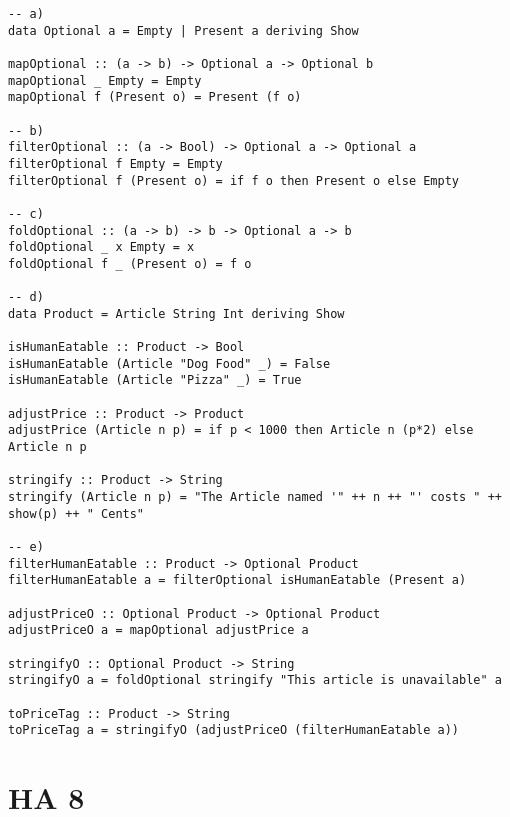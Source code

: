 \documentclass[a4paper]{article}
\begin{document}
\begin{lstlisting}
-- a)
data Optional a = Empty | Present a deriving Show

mapOptional :: (a -> b) -> Optional a -> Optional b
mapOptional _ Empty = Empty
mapOptional f (Present o) = Present (f o)

-- b)
filterOptional :: (a -> Bool) -> Optional a -> Optional a
filterOptional f Empty = Empty
filterOptional f (Present o) = if f o then Present o else Empty 

-- c)
foldOptional :: (a -> b) -> b -> Optional a -> b
foldOptional _ x Empty = x
foldOptional f _ (Present o) = f o

-- d)
data Product = Article String Int deriving Show

isHumanEatable :: Product -> Bool
isHumanEatable (Article "Dog Food" _) = False
isHumanEatable (Article "Pizza" _) = True 

adjustPrice :: Product -> Product
adjustPrice (Article n p) = if p < 1000 then Article n (p*2) else Article n p

stringify :: Product -> String
stringify (Article n p) = "The Article named '" ++ n ++ "' costs " ++ show(p) ++ " Cents"

-- e)
filterHumanEatable :: Product -> Optional Product
filterHumanEatable a = filterOptional isHumanEatable (Present a)

adjustPriceO :: Optional Product -> Optional Product
adjustPriceO a = mapOptional adjustPrice a

stringifyO :: Optional Product -> String
stringifyO a = foldOptional stringify "This article is unavailable" a

toPriceTag :: Product -> String
toPriceTag a = stringifyO (adjustPriceO (filterHumanEatable a))
\end{lstlisting}

\pagebreak

\section*{ HA 8 }
\end{document}

